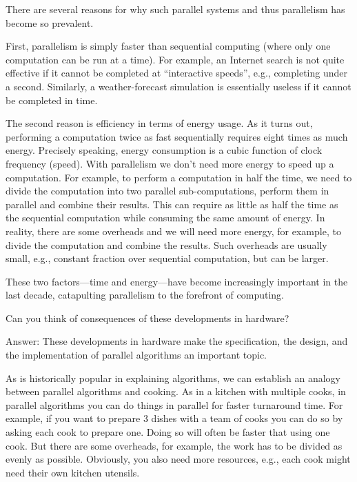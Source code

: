 \begin{gram}
There are several reasons for why such parallel systems and thus
parallelism has become so prevalent.
%


First, parallelism is simply faster than sequential computing (where
only one computation can be run at a time).
%
For example, an Internet search is not quite effective if it cannot be
completed at ``interactive speeds'', e.g., completing under a second.
%
Similarly, a weather-forecast simulation is essentially useless if it
cannot be completed in time.

The second reason is efficiency in terms of energy usage.
%
As it turns out, performing a computation twice as fast sequentially
requires eight times as much energy.  
%
Precisely speaking, energy
consumption is a cubic function of clock frequency (speed).  With
parallelism we don't need more energy to speed up a computation. 
%
For example, to perform a computation in half the time, we need to
divide the computation into two parallel sub-computations, perform
them in parallel and combine their results.  This can require as
little as half the time as the sequential computation while consuming
the same amount of energy.
%
In reality, there are some overheads and we will need more energy, for
example, to divide the computation and combine the results.
Such overheads are usually small, e.g., constant fraction over
sequential computation, but can be larger. 

These two factors---time and energy---have become increasingly
important in the last decade, catapulting parallelism to the forefront
of computing.
\end{gram}



\begin{teachask}
Can you think of consequences of these developments in hardware?  

Answer:
These developments in hardware make the specification, the design, and
the implementation of parallel algorithms an important topic.

\end{teachask}


\begin{example}
As is historically popular in explaining algorithms, we can establish
an analogy between parallel algorithms and cooking.  As in a kitchen
with multiple cooks, in parallel algorithms you can do things in
parallel for faster turnaround time.  For example, if you want to
prepare 3 dishes with a team of cooks you can do so by asking each
cook to prepare one.
%
Doing so will often be faster that using one cook.  But there are some
overheads, for example, the work has to be divided as evenly as
possible.  Obviously, you also need more resources, e.g., each cook
might need their own kitchen utensils.
\end{example}

